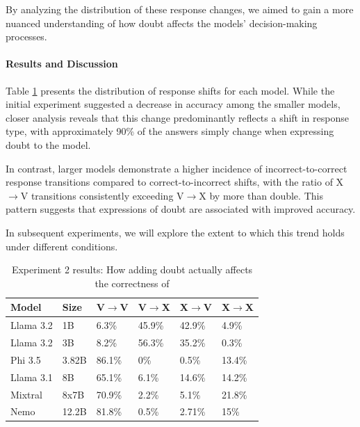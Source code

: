 By analyzing the distribution of these response changes, we aimed to gain a more nuanced understanding of how doubt affects the models' decision-making processes.

\paragraph{Results and Discussion}

Table \ref{tab:accuracy_deep_dive} presents the distribution of response shifts for each model. While the initial experiment suggested a decrease in accuracy among the smaller models, closer analysis reveals that this change predominantly reflects a shift in response type, with approximately 90\% of the answers simply change when expressing doubt to the model.

In contrast, larger models demonstrate a higher incidence of incorrect-to-correct response transitions compared to correct-to-incorrect shifts, with the ratio of X$\rightarrow$V transitions consistently exceeding V$\rightarrow$X by more than double. This pattern suggests that expressions of doubt are associated with improved accuracy.

In subsequent experiments, we will explore the extent to which this trend holds under different conditions.

\begin{table}[ht]
  \centering
  \small %
  \begin{tabular}{|l|l|l|l|l|l|}
    \hline
    \textbf{Model} & \textbf{Size} & \textbf{V$\rightarrow$V} & \textbf{V$\rightarrow$X} & \textbf{X$\rightarrow$V} & \textbf{X$\rightarrow$X} \\
    \hline
    Llama 3.2 & 1B  & 6.3\% & 45.9\% & 42.9\% & 4.9\%\\
    Llama 3.2 & 3B & 8.2\% & 56.3\% & 35.2\% & 0.3\%\\
    Phi 3.5 & 3.82B & 86.1\% & 0\% & 0.5\% & 13.4\%\\
    Llama 3.1 & 8B & 65.1\% & 6.1\% & 14.6\% & 14.2\% \\
    Mixtral & 8x7B &70.9\% & 2.2\% & 5.1\% & 21.8\% \\
    Nemo & 12.2B & 81.8\% & 0.5\% & 2.71\% & 15\%\\
    \hline
  \end{tabular}
  \caption{Experiment 2 results: How adding doubt actually affects the correctness of}
  \label{tab:accuracy_deep_dive}
\end{table}

